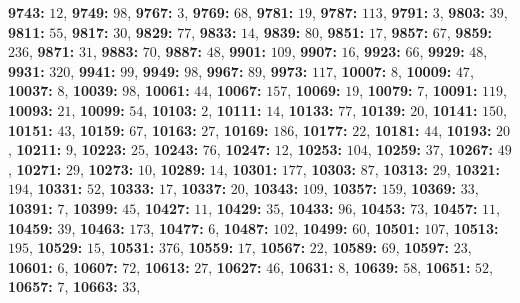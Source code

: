 \textsf{\bfseries 9743:} $12$, \textsf{\bfseries 9749:} $98$, \textsf{\bfseries 9767:} $3$, \textsf{\bfseries 9769:} $68$, \textsf{\bfseries 9781:} $19$, \textsf{\bfseries 9787:} $113$, \textsf{\bfseries 9791:} $3$, \textsf{\bfseries 9803:} $39$, \textsf{\bfseries 9811:} $55$, \textsf{\bfseries 9817:} $30$, \textsf{\bfseries 9829:} $77$, \textsf{\bfseries 9833:} $14$, \textsf{\bfseries 9839:} $80$, \textsf{\bfseries 9851:} $17$, \textsf{\bfseries 9857:} $67$, \textsf{\bfseries 9859:} $236$, \textsf{\bfseries 9871:} $31$, \textsf{\bfseries 9883:} $70$, \textsf{\bfseries 9887:} $48$, \textsf{\bfseries 9901:} $109$, \textsf{\bfseries 9907:} $16$, \textsf{\bfseries 9923:} $66$, \textsf{\bfseries 9929:} $48$, \textsf{\bfseries 9931:} $320$, \textsf{\bfseries 9941:} $99$, \textsf{\bfseries 9949:} $98$, \textsf{\bfseries 9967:} $89$, \textsf{\bfseries 9973:} $117$, \textsf{\bfseries 10007:} $8$, \textsf{\bfseries 10009:} $47$, \textsf{\bfseries 10037:} $8$, \textsf{\bfseries 10039:} $98$, \textsf{\bfseries 10061:} $44$, \textsf{\bfseries 10067:} $157$, \textsf{\bfseries 10069:} $19$, \textsf{\bfseries 10079:} $7$, \textsf{\bfseries 10091:} $119$, \textsf{\bfseries 10093:} $21$, \textsf{\bfseries 10099:} $54$, \textsf{\bfseries 10103:} $2$, \textsf{\bfseries 10111:} $14$, \textsf{\bfseries 10133:} $77$, \textsf{\bfseries 10139:} $20$, \textsf{\bfseries 10141:} $150$, \textsf{\bfseries 10151:} $43$, \textsf{\bfseries 10159:} $67$, \textsf{\bfseries 10163:} $27$, \textsf{\bfseries 10169:} $186$, \textsf{\bfseries 10177:} $22$, \textsf{\bfseries 10181:} $44$, \textsf{\bfseries 10193:} $20$, \textsf{\bfseries 10211:} $9$, \textsf{\bfseries 10223:} $25$, \textsf{\bfseries 10243:} $76$, \textsf{\bfseries 10247:} $12$, \textsf{\bfseries 10253:} $104$, \textsf{\bfseries 10259:} $37$, \textsf{\bfseries 10267:} $49$, \textsf{\bfseries 10271:} $29$, \textsf{\bfseries 10273:} $10$, \textsf{\bfseries 10289:} $14$, \textsf{\bfseries 10301:} $177$, \textsf{\bfseries 10303:} $87$, \textsf{\bfseries 10313:} $29$, \textsf{\bfseries 10321:} $194$, \textsf{\bfseries 10331:} $52$, \textsf{\bfseries 10333:} $17$, \textsf{\bfseries 10337:} $20$, \textsf{\bfseries 10343:} $109$, \textsf{\bfseries 10357:} $159$, \textsf{\bfseries 10369:} $33$, \textsf{\bfseries 10391:} $7$, \textsf{\bfseries 10399:} $45$, \textsf{\bfseries 10427:} $11$, \textsf{\bfseries 10429:} $35$, \textsf{\bfseries 10433:} $96$, \textsf{\bfseries 10453:} $73$, \textsf{\bfseries 10457:} $11$, \textsf{\bfseries 10459:} $39$, \textsf{\bfseries 10463:} $173$, \textsf{\bfseries 10477:} $6$, \textsf{\bfseries 10487:} $102$, \textsf{\bfseries 10499:} $60$, \textsf{\bfseries 10501:} $107$, \textsf{\bfseries 10513:} $195$, \textsf{\bfseries 10529:} $15$, \textsf{\bfseries 10531:} $376$, \textsf{\bfseries 10559:} $17$, \textsf{\bfseries 10567:} $22$, \textsf{\bfseries 10589:} $69$, \textsf{\bfseries 10597:} $23$, \textsf{\bfseries 10601:} $6$, \textsf{\bfseries 10607:} $72$, \textsf{\bfseries 10613:} $27$, \textsf{\bfseries 10627:} $46$, \textsf{\bfseries 10631:} $8$, \textsf{\bfseries 10639:} $58$, \textsf{\bfseries 10651:} $52$, \textsf{\bfseries 10657:} $7$, \textsf{\bfseries 10663:} $33$, 
